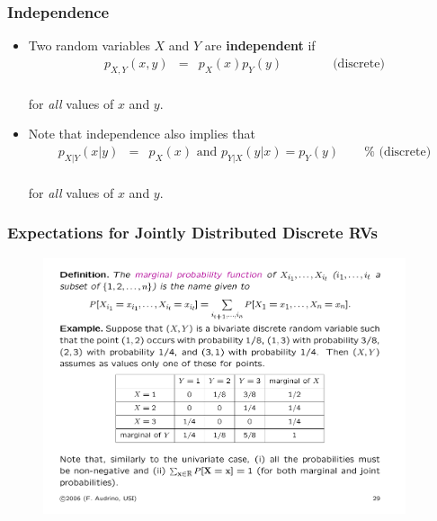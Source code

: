 \documentclass[notes=show,handout]{beamer}
\newenvironment{stepitemize}{\begin{itemize}[<+->]}{\end{itemize} }
\begin{document}
\begin{frame}%

\frametitle{Independence }

\begin{stepitemize}
\item Two random variables $X$ and $Y$ are \textbf{independent} if 
\begin{eqnarray*}
p_{X,Y}(x,y) &=&p_{X}(x)p_{Y}(y)\qquad \qquad \text{(discrete)} \\
\end{eqnarray*}

 for \emph{all} values of $x$ and $y.$

\item Note that independence also implies that 
\begin{eqnarray*}
p_{X|Y}(x|y) &=&p_{X}(x)\text{ and }p_{Y|X}(y|x)=p_{Y}(y)\qquad \text{%
(discrete)} \\
\end{eqnarray*}

for \emph{all} values of $x$ and $y.$
\end{stepitemize}

\end{frame}


\begin{frame}
\frametitle{Expectations for Jointly Distributed Discrete RVs}
\begin{example}
\begin{figure}[ptb]\centering
\includegraphics[width=0.95\textwidth,height=0.75\textheight]{ex_audrins.pdf}
\end{figure}
\end{example}
\end{frame}
\end{document}
